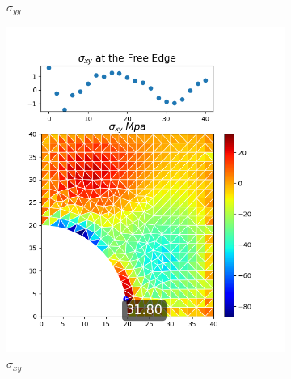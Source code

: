 \documentclass[twoside,twocolumn,10pt]{article}
\begin{document}
\begin{figure}[!ht]
\begin{subfigure}[c]{0.26\textwidth}
    \caption{$\sigma_{yy}$ }
    \label{fig:y_tri_1}
  \end{subfigure}%
  \hfill
  \begin{subfigure}[c]{0.26\textwidth}
    \includegraphics[width=1.\linewidth]{Q2_5/Q5_1_xy_triangle.png}
    \caption{$\sigma_{xy}$}
    \label{fig:xy_tri_1}
  \end{subfigure}%
  \begin{subfigure}[c]{0.26\textwidth}

\end{subfigure}
\end{figure}
\end{document}

